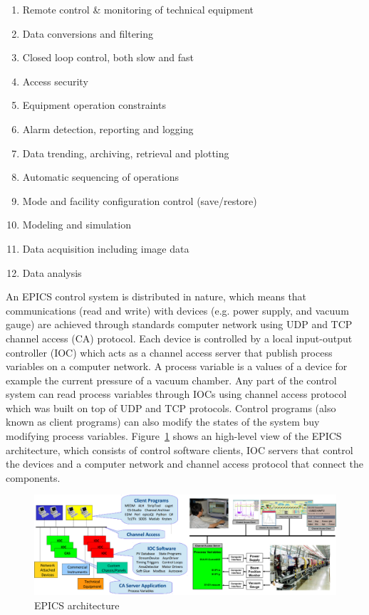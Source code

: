 \begin{enumerate}
\item Remote control \& monitoring of technical equipment
\item Data conversions and filtering
\item Closed loop control, both slow and fast
\item Access security
\item Equipment operation constraints
\item Alarm detection, reporting and logging
\item Data trending, archiving, retrieval and plotting
\item Automatic sequencing of operations
\item Mode and facility configuration control (save/restore)
\item Modeling and simulation
\item Data acquisition including image data
\item Data analysis
\end{enumerate}

An EPICS control system is distributed in nature, which means that communications (read and write) with devices (e.g. power supply, and vacuum gauge) are achieved through standards computer network using UDP and TCP channel access (CA) protocol. Each device is controlled by a local input-output controller (IOC) which acts as a channel access server that publish process variables on a computer network. A process variable is a values of a device for example the current pressure of a vacuum chamber. Any part of the control system can read process variables through IOCs using channel access protocol which was built on top of UDP and TCP protocols. Control programs (also known as client programs) can also modify the states of the system buy modifying process variables. Figure~\ref{epics-arch} shows an high-level view of the EPICS architecture, which consists of control software clients, IOC servers that control the devices and a computer network and channel access protocol that connect the components.

\begin{figure}[h]
\begin{center}
\includegraphics[width=6.5in]{figures/epics-arch.png}
\caption{EPICS architecture \label{epics-arch}}
\end{center}
\end{figure}

